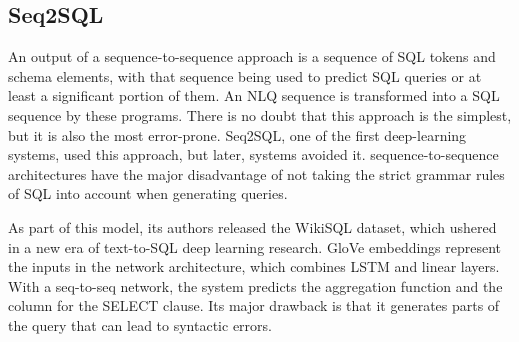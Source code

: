 \subsection*{Seq2SQL}

An output of a sequence-to-sequence approach is a sequence of SQL tokens and schema elements, with that sequence being used to predict SQL queries or at least a significant portion of them. An NLQ sequence is transformed into a SQL sequence by these programs. There is no doubt that this approach is the simplest, but it is also the most error-prone. Seq2SQL\cite{zhong_seq2sql_2017}, one of the first deep-learning systems, used this approach, but later, systems avoided it. sequence-to-sequence architectures have the major disadvantage of not taking the strict grammar rules of SQL into account when generating queries.

As part of this model, its authors released the WikiSQL dataset, which ushered in a new era of text-to-SQL deep learning research. GloVe embeddings represent the inputs in the network architecture, which combines LSTM and linear layers. With a seq-to-seq network, the system predicts the aggregation function and the column for the SELECT clause. Its major drawback is that it generates parts of the query that can lead to syntactic errors.